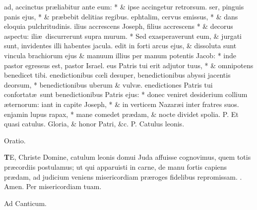 \documentclass[letter,11pt]{book}
\makeatletter
\DeclareRobustCommand{\Rbar}{\vers@resp{0pt}{R}}
\newcommand{\vers@resp@sym}{\raisebox{0.2ex}{\rotatebox[origin=c]{-20}{$\m@th\rceil$}}}
\newcommand{\vers@resp}[2]{%
  {\ooalign{\hidewidth\kern#1\vers@resp@sym\hidewidth\cr#2\cr}}%
}%
\def\P{\color{Red} P. \color{black}}
\def\R{\color{Red} \Rbar . \color{black}}
\makeatother
\begin{document}
\begin{multicols*}{2}
ad, accinctus pr\ae liabitur ante eum: * \& ipse accingetur retrorsum.
ser, pinguis panis ejus, * \& pr\ae bebit delitias regibus.
ephtalim, cervus emissus, * \& dans eloquia pulchritudinis.
ilius accrescens Joseph, filius accrescens * \& decorus aspectu:
ili\ae \ discurrerunt supra murum. * Sed exasperaverunt eum, \& jurgati sunt, invidentes illi habentes jacula.
edit in forti arcus ejus, \& dissoluta sunt vincula brachiorum ejus \& manuum illius per manum potentis Jacob: * inde pastor egressus est, pastor Israel.
eus Patris tui erit adjutor tuus, * \& omnipotens benedicet tibi.
enedictionibus c\oe li desuper, benedictionibus abyssi jacentis deorsum, * benedictionibus uberum \& vulv\ae .
enedictiones Patris tui confortat\ae \ sunt benedictionibus Patris ejus: * donec veniret desiderium collium \ae ternorum:
iant in capite Joseph, * \& in verticem Nazar\ae i inter fratres suos.
enjamin lupus rapax, * mane comedet pr\ae dam, \& nocte dividet spolia.
\newline \P Et quasi catulus. Gloria, \& honor Patri, \&c. \P Catulus leonis.
\vspace{-.5em} \begin{center} \color{Red} Oratio. \color{black} \end{center} \vspace{-.5em}
\lettrine[lines=2]{\bfseries \color{Red} T}{}E, Christe Domine, catulum leonis domui Juda affuisse cognovimus, quem totis pr\ae cordiis postulamus; ut qui apparuisti in carne, de manu fortis capiens pr\ae dam, ad judicium veniens misericordiam pr\ae roges fidelibus repromissam. \R Amen. Per misericordiam tuam.
\vspace{-.5em} \begin{center} \color{Red} Ad Canticum. \color{black} \end{center} \vspace{-.5em}

\end{multicols*}
\end{document}
